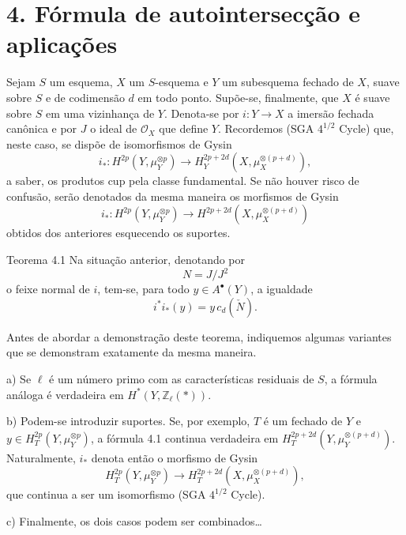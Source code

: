 \section*{4. Fórmula de autointersecção e aplicações}

Sejam $S$ um esquema, $X$ um $S$-esquema e $Y$ um subesquema fechado de $X$, suave sobre $S$ e de codimensão $d$ em todo ponto. Supõe-se, finalmente, que $X$ é suave sobre $S$ em uma vizinhança de $Y$. Denota-se por $i:Y\to X$ a imersão fechada canônica e por $J$ o ideal de $\mathcal O_X$ que define $Y$. Recordemos (SGA $4^{1/2}$ Cycle) que, neste caso, se dispõe de isomorfismos de Gysin
\[
i_*:H^{2p}(Y,\mu_Y^{\otimes p})
\to H_Y^{2p+2d}(X,\mu_X^{\otimes(p+d)}),
\]
a saber, os produtos cup pela classe fundamental. Se não houver risco de confusão, serão denotados da mesma maneira os morfismos de Gysin
\[
i_*:H^{2p}(Y,\mu_Y^{\otimes p})
\to H^{2p+2d}(X,\mu_X^{\otimes(p+d)})
\]
obtidos dos anteriores esquecendo os suportes.

\begin{statement}{Teorema 4.1}
Na situação anterior, denotando por
\[
N=J/J^2
\]
o feixe normal de $i$, tem-se, para todo $y\in A^{\bullet}(Y)$, a igualdade
\[
i^*i_*(y)=y\,c_d(\check N).
\]
\end{statement}

Antes de abordar a demonstração deste teorema, indiquemos algumas variantes que se demonstram exatamente da mesma maneira.

a) Se $\ell$ é um número primo com as características residuais de $S$, a fórmula análoga é verdadeira em $H^*(Y,\mathbb Z_\ell(*))$.

b) Podem-se introduzir suportes. Se, por exemplo, $T$ é um fechado de $Y$ e $y\in H_T^{2p}(Y,\mu_Y^{\otimes p})$, a fórmula 4.1 continua verdadeira em $H_T^{2p+2d}(Y,\mu_Y^{\otimes(p+d)})$. Naturalmente, $i_*$ denota então o morfismo de Gysin
\[
H_T^{2p}(Y,\mu_Y^{\otimes p})
\to H_T^{2p+2d}(X,\mu_X^{\otimes(p+d)}),
\]
que continua a ser um isomorfismo (SGA $4^{1/2}$ Cycle).

c) Finalmente, os dois casos podem ser combinados\dots
